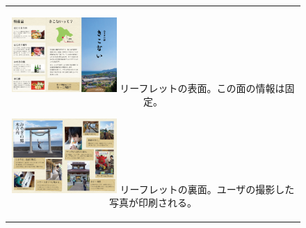 \begin{figure}[htbp]
  \begin{center}
    \begin{tabular}{c}

      \begin{minipage}{0.33\hsize}
        \begin{center}
\includegraphics[width=4cm, bb=0 0 303 573]{leaflet_front.png}
          \hspace{1cm} リーフレットの表面。この面の情報は固定。
          \end{center}
      \end{minipage}

      \begin{minipage}{0.33\hsize}
        \begin{center}
\includegraphics[width=4cm, bb=0 0 304 570]{leaflet_back.png}
          \hspace{1cm} リーフレットの裏面。ユーザの撮影した写真が印刷される。
        \end{center}
      \end{minipage}

    \end{tabular}
    \label{fig:lena}
  \end{center}
\end{figure}

